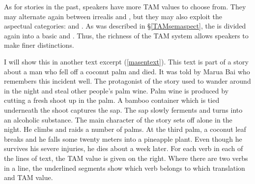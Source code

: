 As for stories in the past, speakers have more TAM values to choose from. They may alternate again between irrealis and , but they may also exploit the aspectual categories:  and . As was described in \S{}\ref{TAMsemaspect}, the  is divided again into a basic  and . Thus, the richness of the TAM system allows speakers to make finer distinctions.%

I will show this in another text excerpt (\ref{masentext}). This text is part of a story about a man who fell off a coconut palm and died. It was told by Marua Bai who remembers this incident well. The protagonist of the story used to wander around in the night and steal other people's palm wine. Palm wine is produced by cutting a fresh shoot up in the palm. A bamboo container which is tied underneath the shoot captures the sap. The sap slowly ferments and turns into an alcoholic substance. The main character of the story sets off alone in the night. He climbs and raids a number of palms. At the third palm, a coconut leaf breaks and he falls some twenty meters into a pineapple plant. Even though he survives his severe injuries, he dies about a week later. For each verb in each of the lines of text, the TAM value is given on the right. Where there are two verbs in a line, the underlined segments show which verb belongs to which translation and TAM value.

